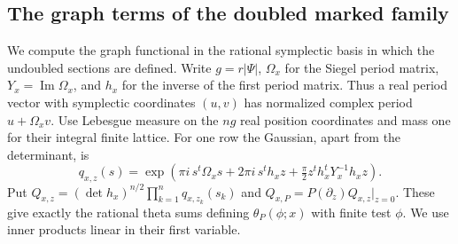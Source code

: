 \subsection{The graph terms of the doubled marked family}
\label{dg:section}

We compute the graph functional in the rational symplectic basis in
which the undoubled sections are defined. Write $g=r|\Psi|$,
$\Omega_x$ for the Siegel period matrix, $Y_x=\operatorname{Im}\Omega_x$,
and $h_x$ for the inverse of the first period matrix. Thus a real
period vector with symplectic coordinates $(u,v)$ has normalized
complex period $u+\Omega_x v$. Use Lebesgue measure on the $ng$ real
position coordinates and mass one for their integral finite lattice.
For one row the Gaussian, apart from the determinant, is
\[
 q_{x,z}(s)=\exp\!\left(\pi i\,s^t\Omega_xs+
          2\pi i\,s^t h_xz+\tfrac{\pi}{2}
                   z^t h_x^tY_x^{-1}h_xz\right).
\]
Put $Q_{x,z}=(\det h_x)^{n/2}\prod_{k=1}^nq_{x,z_k}(s_k)$
and $Q_{x,P}=P(\partial_z)Q_{x,z}|_{z=0}$. These give exactly
the rational theta sums defining $\theta_P(\phi;x)$ with finite
test $\phi$. We use inner products linear in their first variable.

